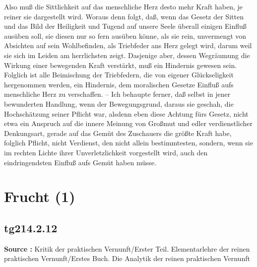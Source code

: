 \documentclass[a4paper,12pt,twoside]{book}
\newcommand{\unnumberedsection}[1]{
	\section*{#1}
	\addcontentsline{toc}{section}{#1}
	\markright{#1}
}
\begin{document}
Also muß die Sittlichkeit auf das menschliche Herz desto mehr Kraft haben, je reiner sie dargestellt wird. Woraus denn folgt, daß, wenn das Gesetz der Sitten und das Bild der Heiligkeit und Tugend auf unsere Seele überall einigen Einfluß ausüben soll, sie diesen nur so fern ausüben könne, als sie rein, unvermengt von Absichten auf sein Wohlbefinden, als Triebfeder ans Herz gelegt wird, darum weil sie sich im Leiden am herrlichsten zeigt. Dasjenige aber, dessen Wegräumung die Wirkung einer bewegenden Kraft verstärkt, muß ein Hindernis gewesen sein. Folglich ist alle Beimischung der Triebfedern, die von eigener Glückseligkeit hergenommen werden, ein Hindernis, dem moralischen Gesetze Einfluß aufs menschliche Herz zu verschaffen. – Ich behaupte ferner, daß selbst in jener bewunderten Handlung, wenn der Bewegungsgrund, daraus sie geschah, die Hochschätzung seiner Pflicht war, alsdenn eben diese Achtung fürs Gesetz, nicht etwa ein Anspruch  auf die innere Meinung von Großmut und edler verdienstlicher Denkungsart, gerade auf das Gemüt des Zuschauers die größte Kraft habe, folglich Pflicht, nicht Verdienst, den nicht allein bestimmtesten, sondern, wenn sie im rechten Lichte ihrer Unverletzlichkeit vorgestellt wird, auch den eindringendsten Einfluß aufs Gemüt haben müsse. 
	
	\unnumberedsection{Frucht (1)} 
	\subsection*{tg214.2.12} 
	\textbf{Source : }Kritik der praktischen Vernunft/Erster Teil. Elementarlehre der reinen praktischen Vernunft/Erstes Buch. Die Analytik der reinen praktischen Vernunft\\  
	
\end{document}
